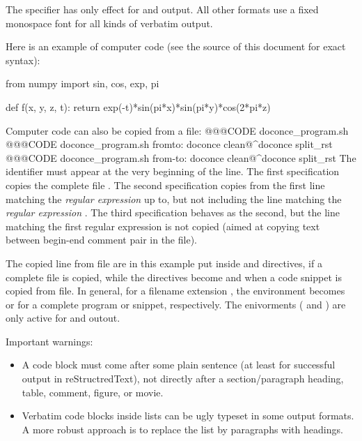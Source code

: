 \documentclass[%
oneside,                 %
final,                   %
chapterprefix=true,      %
open=right               %
10pt]{book}
\begin{document}
{The  specifier has only effect for  and
 output. All other formats use a fixed monospace font for all
kinds of verbatim output.

Here is an example of computer code (see the source of this document
for exact syntax):

\bcod
from numpy import sin, cos, exp, pi

def f(x, y, z, t):
    return exp(-t)*sin(pi*x)*sin(pi*y)*cos(2*pi*z)
\ecod

Computer code can also be copied from a file:
\bccq
 @@@CODE doconce_program.sh
 @@@CODE doconce_program.sh  fromto: doconce clean@^doconce split_rst
 @@@CODE doconce_program.sh  from-to: doconce clean@^doconce split_rst
\eccq
The  identifier must appear at the very beginning of the line.
The first specification copies the complete file .
The second specification copies from the first line matching the \emph{regular
expression}  up to, but not including the line
matching the \emph{regular expression} .
The third specification behaves as the second, but the line matching
the first regular expression is not copied (aimed at copying
text between begin-end comment pair in the file).

The copied line from file are in this example put inside 
and  directives, if a complete file is copied, while the
directives become  and  when a code snippet is copied
from file. In general, for a filename extension , the environment
becomes  or  for a complete program or snippet,
respectively. The enivorments ( and ) are only active
for  and  outout.

Important warnings:

\begin{itemize}
 \item A code block must come after some plain sentence (at least for successful
   output in reStructredText), not directly after a section/paragraph heading,
   table, comment, figure, or movie.

 \item Verbatim code blocks inside lists can be ugly typeset in some
   output formats. A more robust approach is to replace the list by
   paragraphs with headings.
\end{itemize}

}
\end{document}
